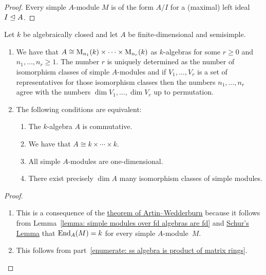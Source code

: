 \begin{proof}
  Every simple $A$-module $M$ is of the form $A/I$ for a (maximal) left ideal $I \trianglelefteq A$.
\end{proof}


\begin{corollary}
  \label{corollary: semisimple algebra product of matrix algebras}
  Let $k$ be algebraically closed and let $A$ be finite-dimensional and semisimple.
  \begin{enumerate}
    \item
      \label{enumerate: ss algebra is product of matrix rings}
      We have that $A \cong \operatorname{M}_{n_1}(k) \times \dotsm \times \operatorname{M}_{n_r}(k)$ as $k$-algebras for some $r \geq 0$ and $n_1, \dotsc, n_r \geq 1$.
      The number $r$ is uniquely determined as the number of isomorphism classes of simple $A$-modules and if $V_1, \dotsc, V_r$ is a set of representatives for those isomorphism classes then the numbers $n_1, \dotsc, n_r$ agree with the numbers $\dim V_1, \dotsc, \dim V_r$ up to permutation.
    \item
      The following conditions are equivalent:
      \begin{enumerate}
        \item
          The $k$-algebra $A$ is commutative.
        \item
          We have that $A \cong k \times \dotsb \times k$.
        \item
          All simple $A$-modules are one-dimensional.
        \item
          There exist precisely $\dim A$ many isomorphism classes of simple modules.
      \end{enumerate}
  \end{enumerate}
\end{corollary}


\begin{proof}
  \leavevmode
  \begin{enumerate}
    \item
      This is a consequence of the \hyperref[theorem: artin wedderburn theorem]{theorem of Artin--Wedderburn} because it follows from Lemma~\ref{lemma: simple modules over fd algebras are fd} and \hyperref[proposition: schurs lemma for modules]{Schur’s Lemma} that $\operatorname{End}_A(M) = k$ for every simple $A$-module~$M$.
    \item
      This follows from part~\ref*{enumerate: ss algebra is product of matrix rings}.
    \qedhere
  \end{enumerate}
\end{proof}


